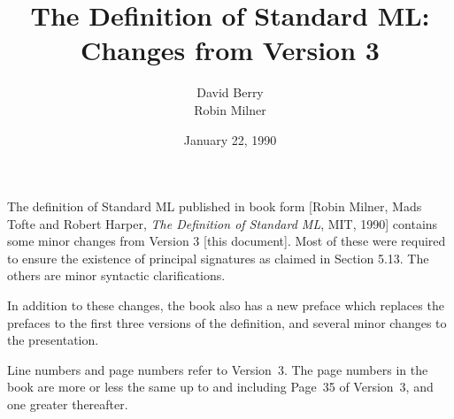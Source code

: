 \title{The Definition of Standard ML:\\
Changes from Version 3}
\author{David Berry\\Robin Milner}
\date{January 22, 1990}


\maketitle

\noindent
The definition of Standard ML published in book form
[Robin Milner, Mads Tofte and Robert Harper, {\it The Definition of
Standard ML}, MIT, 1990]
contains some minor changes from Version 3 [this document].
Most of these were required
to ensure the existence of principal signatures as claimed in Section 5.13.  
The others are minor syntactic clarifications.

In addition to these changes, the book also has a new preface which
replaces the prefaces to the first three versions of the definition, and
several minor changes to the presentation.

Line numbers and page numbers refer to Version~3.  The page numbers in
the book are more or less the same up to and including Page~35 of Version~3,
and one greater thereafter.
\bigskip

